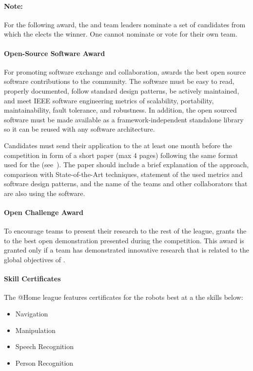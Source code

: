 \paragraph*{Note: } For the following award, the \TC{} and team leaders nominate a set of candidates from which the \EC{} elects the winner. One cannot nominate or vote for their own team.

\paragraph{Open-Source Software Award}
\label{sec:introduction:assaward}
For promoting software exchange and collaboration, \RoboCup\AtHome{} awards the best open source software contributions to the community. The software must be easy to read, properly documented, follow standard design patterns, be actively maintained, and meet IEEE software engineering metrics of scalability, portability, maintainability, fault tolerance, and robustness. In addition, the open sourced software must be made available as a framework-independent standalone library so it can be reused with any software architecture.

Candidates must send their application to the \TC{} at least one month before the competition in form of a short paper (max 4 pages) following the same format used for the \TDP{} (see~). The paper should include a brief explanation of the approach, comparison with State-of-the-Art techniques, statement of the used metrics and software design patterns, and the name of the teams and other collaborators that are also using the software.


\paragraph{Open Challenge Award}
\label{sec:introduction:ocaward}

To encourage teams to present their research to the rest of the league, \AtHome{} grants the \OCAward{} to the best open demonstration presented during the competition. This award is granted only if a team has demonstrated innovative research that is related to the global objectives of \AtHome{}. 


\paragraph{Skill Certificates}
\label{award:skill}
The @Home league features certificates for the robots best at a the skills below:
\begin{itemize}
	\item Navigation
	\item Manipulation
	\item Speech Recognition
	\item Person Recognition
\end{itemize}

